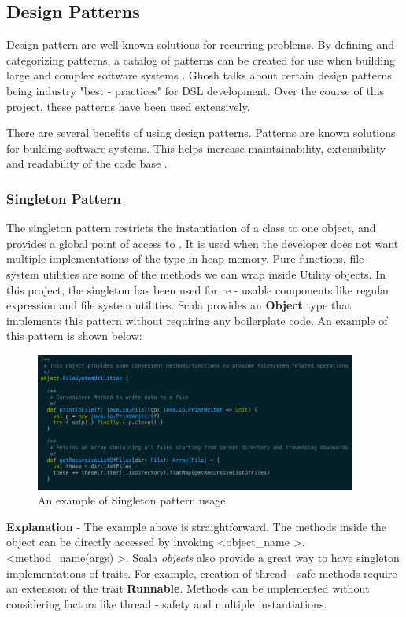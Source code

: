 \newpage
\subsection{Design Patterns}

Design pattern are well known solutions for recurring problems. By defining and categorizing patterns, a catalog of patterns can be created for use when building large and complex software systems \cite{gof}. Ghosh \cite{dslsInAction} talks about certain design patterns being industry "best - practices" for DSL development. Over the course of this project, these patterns have been used extensively.
\bigskip

\noindent
There are several benefits of using design patterns. Patterns are known solutions for building software systems. This helps increase maintainability, extensibility and readability of the code base \cite{iceland}.

\subsubsection{Singleton Pattern}
The singleton pattern restricts the instantiation of a class to one object, and provides a global point of access to \cite{gof}. It is used when the developer does not want multiple implementations of the type in heap memory. Pure functions, file - system utilities are some of the methods we can wrap inside Utility objects. In this project, the singleton has been used for re - usable components like regular expression and file system utilities. Scala provides an \textbf{Object} type that implements this pattern without requiring any boilerplate code. An example of this pattern is shown below:

\begin{figure}[H]
  \centering
    \includegraphics[width=400px]{figures/singleton.png}
  \caption{An example of Singleton pattern usage}
\end{figure}

\noindent
\textbf{Explanation} - The example above is straightforward. The methods inside the object can be directly accessed by invoking \textless object\_name \textgreater.\textless method\_name(args) \textgreater. Scala \textit{objects} also provide a great way to have singleton implementations of traits.
For example, creation of thread - safe methods require an extension of the trait \textbf{Runnable}. Methods can be implemented without considering factors like thread - safety and multiple instantiations.

